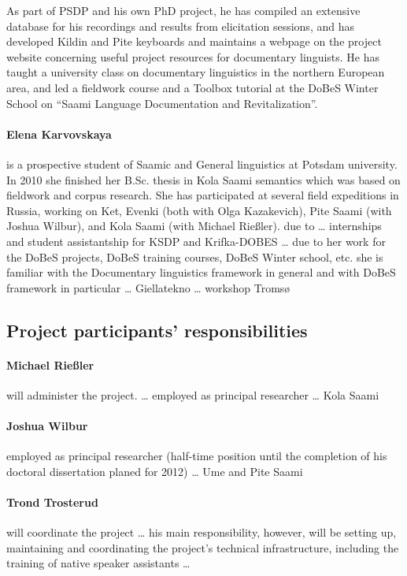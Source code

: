 \documentclass[a4paper,12pt]{article}
\begin{document}
As part of PSDP and his own PhD project, he has compiled an extensive database for his recordings and results from elicitation sessions, and has developed Kildin and Pite keyboards and maintains a webpage on the project website concerning useful project resources for documentary linguists. He has taught a university class on documentary linguistics in the northern European area, and led a fieldwork course and a Toolbox tutorial at the DoBeS Winter School on “Saami Language Documentation and Revitalization”.


\paragraph{Elena Karvovskaya} is a prospective %
student of Saamic and General linguistics at Potsdam university. In 2010 she finished her B.Sc. thesis in Kola Saami semantics which was based on fieldwork and corpus research. She has participated at several field expeditions in Russia, working on %
 Ket, Evenki (both with Olga Kazakevich), Pite Saami (with Joshua Wilbur), and Kola Saami (with Michael Rießler). due to  … internships and student assistantship for KSDP and Krifka-DOBES …  due to her work for the DoBeS projects, DoBeS training courses, DoBeS Winter school, etc. she is familiar with the Documentary linguistics framework in general and with DoBeS framework in particular … Giellatekno … workshop Tromsø 

\subsection{Project participants' responsibilities}

\paragraph{Michael Rießler} will administer the project. … employed as principal researcher … Kola Saami 

\paragraph{Joshua Wilbur} employed as principal researcher (half-time position until the completion of his doctoral dissertation planed for 2012) … Ume and Pite Saami 

\paragraph{Trond Trosterud} will coordinate the project … his main responsibility, however, will be setting up, maintaining and coordinating the project's technical infrastructure, including the training of native speaker assistants …
\end{document}
